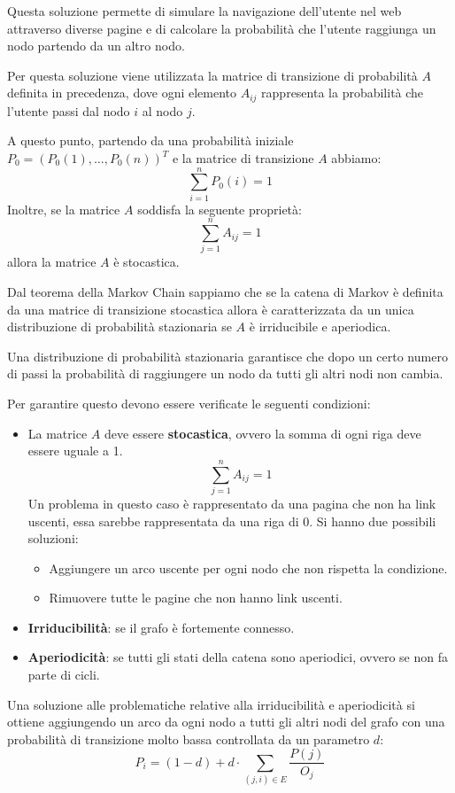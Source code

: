 Questa soluzione permette di simulare la navigazione dell'utente nel web
attraverso diverse pagine e di calcolare la probabilità che l'utente raggiunga
un nodo partendo da un altro nodo.

Per questa soluzione viene utilizzata la matrice di transizione di probabilità
$A$ definita in precedenza, dove ogni elemento $A_{ij}$ rappresenta la probabilità
che l'utente passi dal nodo $i$ al nodo $j$.

A questo punto, partendo da una probabilità iniziale $P_0 = (P_0(1), \dots, P_0(n))^T$
e la matrice di transizione $A$ abbiamo:
\begin{equation*}
    \sum_{i = 1}^n P_0(i) = 1
\end{equation*}
Inoltre, se la matrice $A$ soddisfa la seguente proprietà:
\begin{equation*}
    \sum_{j = 1}^n A_{ij} = 1
\end{equation*}
allora la matrice $A$ è stocastica.

Dal teorema della Markov Chain sappiamo che se la catena di Markov è definita da
una matrice di transizione stocastica allora è caratterizzata da un unica
distribuzione di probabilità stazionaria se $A$ è irriducibile e aperiodica.
\begin{nota}
    Una distribuzione di probabilità stazionaria garantisce che dopo un certo
    numero di passi la probabilità di raggiungere un nodo da tutti gli altri
    nodi non cambia.
\end{nota}
Per garantire questo devono essere verificate le seguenti condizioni:
\begin{itemize}
    \item La matrice $A$ deve essere \textbf{stocastica}, ovvero la somma di
          ogni riga deve essere uguale a 1.
          \begin{equation*}
              \sum_{j = 1}^n A_{ij} = 1
          \end{equation*}
          Un problema in questo caso è rappresentato da una pagina che non ha
          link uscenti, essa sarebbe rappresentata da una riga di $0$. Si hanno
          due possibili soluzioni:
          \begin{itemize}
              \item Aggiungere un arco uscente per ogni nodo che non rispetta la
                    condizione.
              \item Rimuovere tutte le pagine che non hanno link uscenti.
          \end{itemize}
    \item \textbf{Irriducibilità}: se il grafo è fortemente connesso.
    \item \textbf{Aperiodicità}: se tutti gli stati della catena sono aperiodici,
          ovvero se non fa parte di cicli.
\end{itemize}
Una soluzione alle problematiche relative alla irriducibilità e aperiodicità
si ottiene aggiungendo un arco da ogni nodo a tutti gli altri nodi del grafo con
una probabilità di transizione molto bassa controllata da un parametro $d$:
\begin{equation}
    P_{i} = (1 - d) + d \cdot \sum_{(j, i) \in E}\frac{P(j)}{O_j}
\end{equation}

